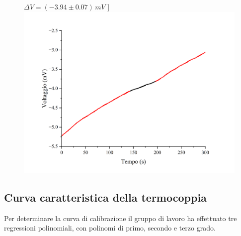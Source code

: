 \documentclass{article}
\begin{document}
\begin{figure}[H]
    $\Delta V=(-3.94\pm0.07)\,\unit{mV}$
  ]{\includegraphics[trim={1cm 0.6cm 1cm 1cm},clip,width=.49\textwidth]{img/etanolo.png}}\hfil
  \hfil
\end{figure}

\pagebreak
\subsection{Curva caratteristica della termocoppia}

Per determinare la curva di calibrazione il gruppo di lavoro ha effettuato
tre regressioni polinomiali, con polinomi di primo, secondo e terzo grado.
\end{document}
